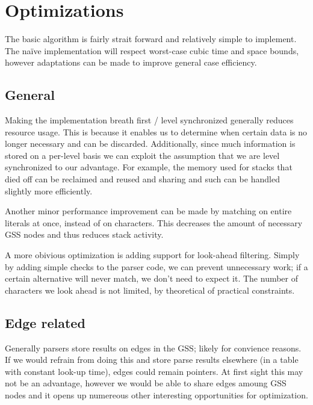 \documentclass[a4paper,10pt]{article}
\begin{document}
\section{Optimizations}

The basic algorithm is fairly strait forward and relatively simple to implement. The naïve implementation will respect worst-case cubic time and space bounds, however adaptations can be made to improve general case efficiency.

\subsection{General}

Making the implementation breath first / level synchronized generally reduces resource usage. This is because it enables us to determine when certain data is no longer necessary and can be discarded. Additionally, since much information is stored on a per-level basis we can exploit the assumption that we are level synchronized to our advantage. For example, the memory used for stacks that died off can be reclaimed and reused and sharing and such can be handled slightly more efficiently.

Another minor performance improvement can be made by matching on entire literals at once, instead of on characters. This decreases the amount of necessary GSS nodes and thus reduces stack activity.

A more obivious optimization is adding support for look-ahead filtering. Simply by adding simple checks to the parser code, we can prevent unnecessary work; if a certain alternative will never match, we don't need to expect it. The number of characters we look ahead is not limited, by theoretical of practical constraints.

\subsection{Edge related}

Generally parsers store results on edges in the GSS; likely for convience reasons. If we would refrain from doing this and store parse results elsewhere (in a table with constant look-up time), edges could remain pointers. At first sight this may not be an advantage, however we would be able to share edges amoung GSS nodes and it opens up numereous other interesting opportunities for optimization.
\end{document}
